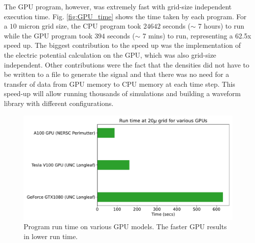 The GPU program, however, was extremely fast with grid-size independent execution time. Fig. \ref{fig:GPU_time} shows the time taken by each program. For a $10$ micron grid size, the CPU program took $24642$ seconds ($\sim$ 7 hours) to run while the GPU program took $394$ seconds ($\sim$ 7 mins) to run, representing a 62.5x speed up. The biggest contribution to the speed up was the implementation of the electric potential calculation on the GPU, which was also grid-size independent. Other contributions were the fact that the densities did not have to be written to a file to generate the signal and that there was no need for a transfer of data from GPU memory to CPU memory at each time step. This speed-up will allow running thousands of simulations and building a waveform library with different configurations.

 \begin{figure}[!htb]
    \centering
    \includegraphics[width=0.99\linewidth]{ch4/figs/gpu_comp.pdf}
\caption{\label{ch4:fig:GPU_comp} Program run time on various GPU models. The faster GPU results in lower run time.}
\end{figure}

